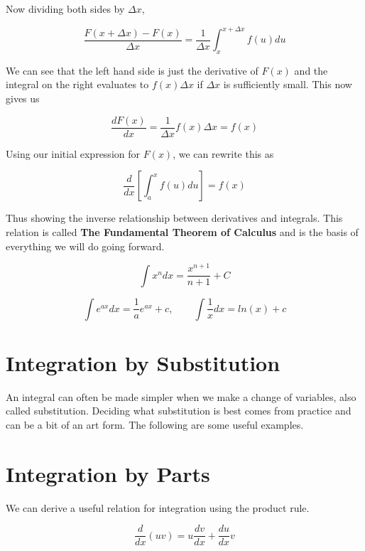 Now dividing both sides by $\Delta x$,

\begin{equation*}
    \frac{F(x + \Delta x) - F(x)}{\Delta x} = 
    \frac{1}{\Delta x}\int_{x}^{x + \Delta x}f(u)du
\end{equation*}

We can see that the left hand side is just the derivative of $F(x)$ and the integral on the 
right evaluates to $f(x)\Delta x$ if $\Delta x $ is sufficiently small. This now gives us

\begin{equation*}
    \frac{dF(x)}{dx} = \frac{1}{\Delta x}f(x)\Delta x = f(x)
\end{equation*}

Using our initial expression for $F(x)$, we can rewrite this as

\begin{equation*}
    \frac{d}{dx}\left[\int_{a}^{x}f(u)du\right] = f(x)
\end{equation*}

Thus showing the inverse relationship between derivatives and integrals. This relation is called
\textbf{The Fundamental Theorem of Calculus} and is the basis of everything we will do going 
forward.

\begin{equation*}
    \int x^{n}dx = \frac{x^{n+1}}{n+1} + C
\end{equation*}

\[\int e^{ax}dx = \frac{1}{a}e^{ax} + c, \qquad \int \frac{1}{x}dx = ln(x) + c\]

\section{Integration by Substitution}
An integral can often be made simpler when we make a change of variables, also called substitution.
Deciding what substitution is best comes from practice and can be a bit of an art form. The following
are some useful examples.

\section{Integration by Parts}

We can derive a useful relation for integration using the product rule.

\begin{equation*}
    \frac{d}{dx}(uv) = u \frac{dv}{dx} + \frac{du}{dx} v
\end{equation*}

